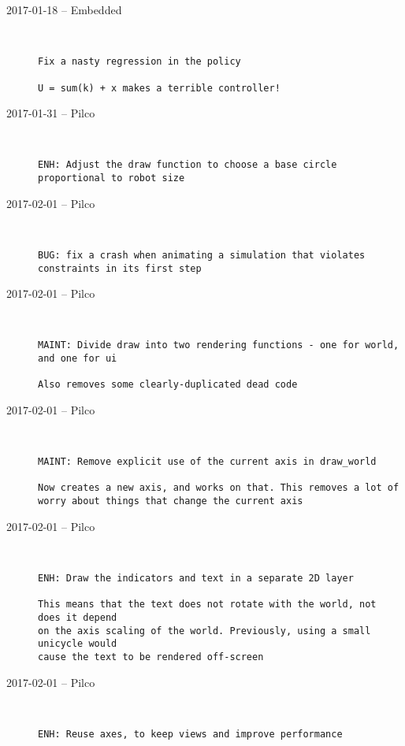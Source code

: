 \begin{description}
  \item[2017-01-18 -- Embedded] \hfill \
\begin{lstlisting}
Fix a nasty regression in the policy

U = sum(k) + x makes a terrible controller!
\end{lstlisting}


  \item[2017-01-31 -- Pilco] \hfill \
\begin{lstlisting}
ENH: Adjust the draw function to choose a base circle proportional to robot size
\end{lstlisting}


  \item[2017-02-01 -- Pilco] \hfill \
\begin{lstlisting}
BUG: fix a crash when animating a simulation that violates constraints in its first step
\end{lstlisting}


  \item[2017-02-01 -- Pilco] \hfill \
\begin{lstlisting}
MAINT: Divide draw into two rendering functions - one for world, and one for ui

Also removes some clearly-duplicated dead code
\end{lstlisting}


  \item[2017-02-01 -- Pilco] \hfill \
\begin{lstlisting}
MAINT: Remove explicit use of the current axis in draw_world

Now creates a new axis, and works on that. This removes a lot of worry about things that change the current axis
\end{lstlisting}


  \item[2017-02-01 -- Pilco] \hfill \
\begin{lstlisting}
ENH: Draw the indicators and text in a separate 2D layer

This means that the text does not rotate with the world, not does it depend
on the axis scaling of the world. Previously, using a small unicycle would
cause the text to be rendered off-screen
\end{lstlisting}


  \item[2017-02-01 -- Pilco] \hfill \
\begin{lstlisting}
ENH: Reuse axes, to keep views and improve performance


\end{lstlisting}
\end{description}
